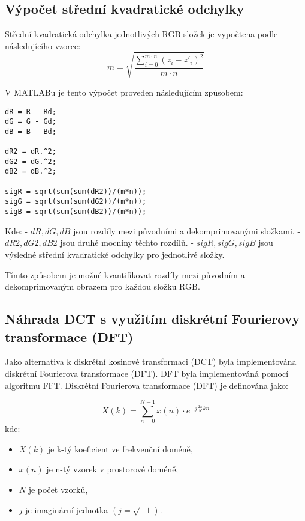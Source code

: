 \subsection{Výpočet střední kvadratické odchylky}
Střední kvadratická odchylka jednotlivých RGB složek je vypočtena podle následujícího vzorce:
\[
m = \sqrt{\frac{\sum_{i=0}^{m \cdot n} (z_i - z'_i)^2}{m \cdot n}}
\]

V MATLABu je tento výpočet proveden následujícím způsobem:
\begin{verbatim}
dR = R - Rd;
dG = G - Gd;
dB = B - Bd;

dR2 = dR.^2;
dG2 = dG.^2;
dB2 = dB.^2;

sigR = sqrt(sum(sum(dR2))/(m*n));
sigG = sqrt(sum(sum(dG2))/(m*n));
sigB = sqrt(sum(sum(dB2))/(m*n));
\end{verbatim}

Kde:
- \( dR, dG, dB \) jsou rozdíly mezi původními a dekomprimovanými složkami.
- \( dR2, dG2, dB2 \) jsou druhé mocniny těchto rozdílů.
- \( sigR, sigG, sigB \) jsou výsledné střední kvadratické odchylky pro jednotlivé složky.

Tímto způsobem je možné kvantifikovat rozdíly mezi původním a dekomprimovaným obrazem pro každou složku RGB.

\subsection{Náhrada DCT s využitím diskrétní Fourierovy transformace (DFT)}

Jako alternativa k diskrétní kosinové transformaci (DCT) byla implementována diskrétní Fourierova transformace (DFT). DFT byla implementováná pomocí algoritmu FFT.\cite{FFTWiki} Diskrétní Fourierova transformace (DFT) je definována jako:

\[
X(k) = \sum_{n=0}^{N-1} x(n) \cdot e^{-j \frac{2\pi}{N} kn}
\]
kde:\begin{itemize}
    \item \( X(k) \) je k-tý koeficient ve frekvenční doméně,
    \item \( x(n) \) je n-tý vzorek v prostorové doméně,
    \item \( N \) je počet vzorků,
    \item \( j \) je imaginární jednotka \((j = \sqrt{-1})\).
\end{itemize}

